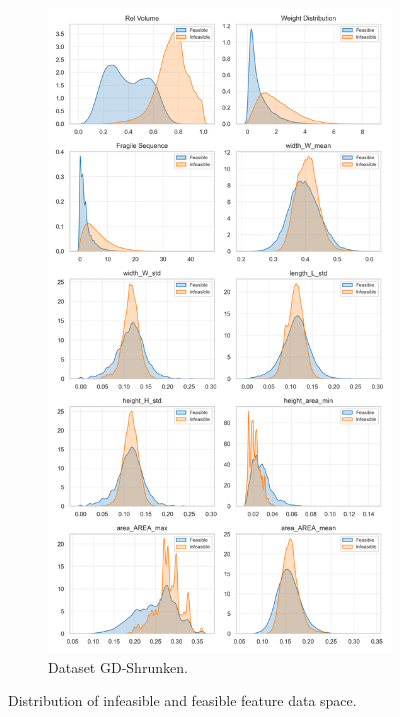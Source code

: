 \begin{figure}[!ht]
\begin{subfigure}[t]{0.49\textwidth}
		\centering
		\caption{Dataset GD-Shrunken.}
		\includegraphics[width=\textwidth]{pictures/dataset_structure/Distribution_CPStatus_RouteDataset.png}
	\end{subfigure}
	\caption{Distribution of infeasible and feasible feature data space.}
	\label{fig:distribution_cp_label}
\end{figure}


